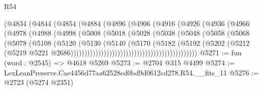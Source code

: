 \begin{lexlean}{R54}
\begin{coremodule}
                                  (@4834
                                    (@4844
                                      (@4854
                                        (@4884
                                          (@4896
                                            (@4906
                                              (@4916
                                                (@4926
                                                  (@4936
                                                    (@4966
                                                      (@4978
                                                        (@4988
                                                          (@4998
                                                            (@5008
                                                              (@5018
                                                                (@5028
                                                                  (@5038
                                                                    (@5048
                                                                      (@5058
                                                                        (@5068
                                                                          (@5078
                                                                            (@5108
                                                                              (@5120
                                                                                (@5130
                                                                                  (@5140
                                                                                    (@5170
                                                                                      (@5182
                                                                                        (@5192
                                                                                          (@5202
                                                                                            (@5212
                                                                                              (@5219
                                                                                                @5221
                                                                                                @2686))))))))))))))))))))))))))))))))))))))))))))))
@5271 := fun (word : @2545) => @4618 @5269
@5273 := @2704 @315 @4499
@5274 := LexLeanPreserve.Cae4456d77aa62528ed0bd9d0612cd278.R54.__fits_11
@5276 := @2723 (@5274 @2351)

\end{coremodule}
\end{lexlean}

